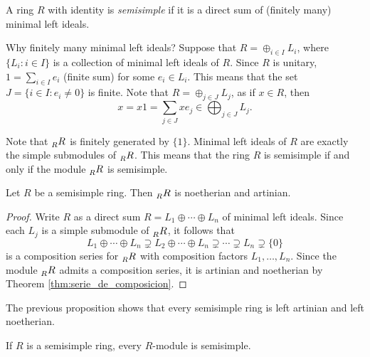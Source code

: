 \begin{definition}
    A ring $R$ with identity is \emph{semisimple} if it is a direct sum of (finitely many) 
    minimal left ideals. 
\end{definition}

Why finitely many minimal left ideals?
Suppose that $R=\oplus_{i\in I}L_i$, where $\{L_i:i\in I\}$ is a collection of
minimal left ideals of $R$. 
Since $R$ is unitary, $1=\sum_{i\in I}e_i$ (finite sum) for 
some $e_i\in L_i$. This means that the set $J=\{i\in I:e_i\ne 0\}$ is finite.
Note that $R=\oplus_{j\in J}L_j$, as 
if $x\in R$, then 
\[
x=x1=\sum_{j\in J}xe_j\in \bigoplus_{j\in J}L_j.
\]

Note
that $\prescript{}{R}{R}$ is finitely generated by $\{1\}$. Minimal left ideals of $R$ 
are exactly the simple submodules of $\prescript{}{R}{R}$. 
This means that 
the ring $R$ is semisimple if and only if the module
$\prescript{}{R}{R}$ is semisimple.  

\begin{proposition}
    Let $R$ be a semisimple ring. Then $\prescript{}{R}{R}$ is noetherian and artinian.
\end{proposition}

\begin{proof}
    Write $R$ as a direct sum $R=L_1\oplus\cdots\oplus L_n$ of minimal left ideals. Since 
    each $L_j$ is a simple submodule of $\prescript{}{R}{R}$, it follows that 
    \[
    L_1\oplus\cdots\oplus L_n\supsetneq L_2\oplus\cdots\oplus L_n\supsetneq\cdots\supsetneq L_n\supsetneq\{0\}
    \]
    is a composition series for $\prescript{}{R}{R}$ with composition factors
    $L_1,\dots,L_n$. Since the module $\prescript{}{R}{R}$ admits a composition
    series, it is artinian and noetherian by Theorem \ref{thm:serie_de_composicion}. 
\end{proof}

The previous proposition shows 
that every semisimple ring is left artinian and left noetherian. 

\begin{exercise}
\label{xca:semisimple}
    If $R$ is a semisimple ring, every $R$-module is semisimple. 
\end{exercise}


